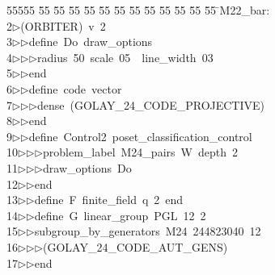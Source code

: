 %
%
\begin{tabbing}
55555 \= 55 \= 55 \= 55 \= 55 \= 55 \= 55 \= 55 \= 55 \= 55 \= 55 \= 55 \= 55 \= \>M22\_bar:\\[0pt]
2\>$\triangleright$\>(ORBITER)\ v\ 2\ \\[0pt]
3\>$\triangleright$\>$\triangleright$\>define\ Do\ draw\_options\ \\[0pt]
4\>$\triangleright$\>$\triangleright$\>$\triangleright$\>radius\ 50\ scale\ 05\ \ line\_width\ 03\ \\[0pt]
5\>$\triangleright$\>$\triangleright$\>end\ \\[0pt]
6\>$\triangleright$\>$\triangleright$\>define\ code\ vector\ \\[0pt]
7\>$\triangleright$\>$\triangleright$\>$\triangleright$\>dense\ (GOLAY\_24\_CODE\_PROJECTIVE)\ \\[0pt]
8\>$\triangleright$\>$\triangleright$\>end\ \\[0pt]
9\>$\triangleright$\>$\triangleright$\>define\ Control2\ poset\_classification\_control\ \\[0pt]
10\>$\triangleright$\>$\triangleright$\>$\triangleright$\>problem\_label\ M24\_pairs\ W\ depth\ 2\ \\[0pt]
11\>$\triangleright$\>$\triangleright$\>$\triangleright$\>draw\_options\ Do\ \\[0pt]
12\>$\triangleright$\>$\triangleright$\>end\ \\[0pt]
13\>$\triangleright$\>$\triangleright$\>define\ F\ finite\_field\ q\ 2\ end\ \\[0pt]
14\>$\triangleright$\>$\triangleright$\>define\ G\ linear\_group\ PGL\ 12\ 2\ \\[0pt]
15\>$\triangleright$\>$\triangleright$\>subgroup\_by\_generators\ M24\ 244823040\ 12\ \\[0pt]
16\>$\triangleright$\>$\triangleright$\>$\triangleright$\>(GOLAY\_24\_CODE\_AUT\_GENS)\ \\[0pt]
17\>$\triangleright$\>$\triangleright$\>end\ \\[0pt]

\end{tabbing}

